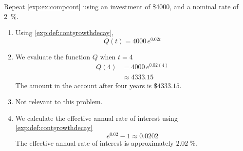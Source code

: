 \begin{doyouunderstand}
	\begin{problem}
	Repeat \cref{exp:ex:compcont} using an investment of \$4000, and a 
	nominal rate of \SI{2}{\percent}.
	\begin{shortsolution}
		\begin{enumerate}
			\item Using \cref{exp:def:contgrowthdecay}, 
			\[
				Q(t) = 4000\,e^{0.02t}
			\]
			\item We evaluate the function $Q$ when $t=4$
			\begin{align*}
				Q(4) & = 4000\,e^{0.02(4)} \\
				     & \approx 4333.15     
			\end{align*}
			The amount in the account after four years is $\$4333.15$.
			\item Not relevant to this problem.
			\item We calculate the effective annual rate of interest using \cref{exp:def:contgrowthdecay}
			\[
				e^{0.02}-1\approx 0.0202
			\]
			The effective annual rate of interest is approximately $\SI{2.02}{\percent}$. 
		\end{enumerate}
	\end{shortsolution}
	\end{problem}
\end{doyouunderstand}
			
